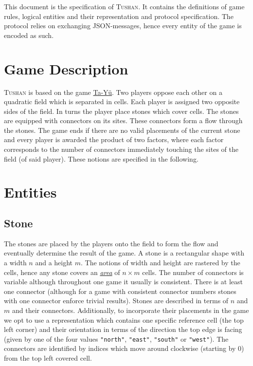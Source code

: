 \documentclass{scrartcl}
\title{\tushan{}}
\author{Voltidioten}
\newcommand{\tushan}{\textsc{Tushan}}
\begin{document}
\maketitle

This document is the specification of \tushan{}. It contains the 
definitions of game rules, logical entities and their representation and 
protocol specification. The protocol relies on exchanging JSON-messages, hence
every entity of the game is encoded as such.

\section{Game Description}
\tushan{} is based on the game 
\href{https://en.wikipedia.org/wiki/Ta\_Y\%C3\%BC}{Ta-Yü}. Two players
oppose each other on a quadratic field which is separated in cells. Each player 
is assigned two opposite sides of the field. In turns the player place stones
which cover cells. The stones are equipped with connectors on its sites. These
connectors form a flow through the stones. The game ends if there are no valid
placements of the current stone and every player is awarded the product of two
factors, where each factor corresponds to the number of connectors immediately
touching the sites of the field (of said player). These notions are specified
in the following.

\section{Entities}

\subsection{Stone}
\hypertarget{stone}{}
The stones are placed by the players onto the field to form the flow and 
eventually determine the result of the game. A stone is a rectangular shape 
with a width $n$ and a height $m$. The notions of width and height are rastered 
by the cells, hence any stone covers an \hyperlink{area}{\emph{area}} of 
$n\times m$ cells. The number of connectors is variable although throughout one 
game it usually is consistent. There is at least one connector (although for a 
game with consistent connector numbers stones with one connector enforce 
trivial results). Stones are described in terms of $n$ and $m$ and their 
connectors. Additionally, to incorporate their placements in the game we opt to 
use a representation which contains one specific reference cell (the top left 
corner) and their orientation in terms of the direction the top edge is facing 
(given by one of the four values \texttt{"north"}, 
\texttt{"east"}, \texttt{"south"} or 
\texttt{"west"}). The connectors are identified by indices which move 
around clockwise (starting by $0$) from the top left covered cell.
\end{document}
